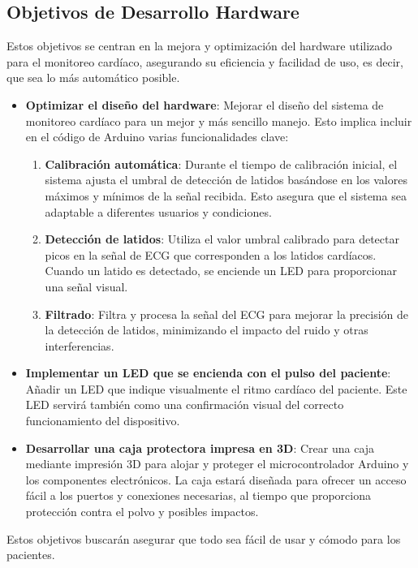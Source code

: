 \subsection{Objetivos de Desarrollo Hardware}

Estos objetivos se centran en la mejora y optimización del hardware utilizado para el monitoreo cardíaco, asegurando su eficiencia y facilidad de uso, es decir, que sea lo más automático posible.

\begin{itemize}
\item \textbf{Optimizar el diseño del hardware}: Mejorar el diseño del sistema de monitoreo cardíaco para un mejor y más sencillo manejo. Esto implica incluir en el código de Arduino varias funcionalidades clave:
\begin{enumerate}
    \item \textbf{Calibración automática}: Durante el tiempo de calibración inicial, el sistema ajusta el umbral de detección de latidos basándose en los valores máximos y mínimos de la señal recibida. Esto asegura que el sistema sea adaptable a diferentes usuarios y condiciones.
    \item \textbf{Detección de latidos}: Utiliza el valor umbral calibrado para detectar picos en la señal de ECG que corresponden a los latidos cardíacos. Cuando un latido es detectado, se enciende un LED para proporcionar una señal visual.
    \item \textbf{Filtrado}: Filtra y procesa la señal del ECG para mejorar la precisión de la detección de latidos, minimizando el impacto del ruido y otras interferencias.
\end{enumerate}


\item \textbf{Implementar un LED que se encienda con el pulso del paciente}: Añadir un LED que indique visualmente el ritmo cardíaco del paciente. Este LED servirá también como una confirmación visual del correcto funcionamiento del dispositivo.
\item \textbf{Desarrollar una caja protectora impresa en 3D}: Crear una caja mediante impresión 3D para alojar y proteger el microcontrolador Arduino y los componentes electrónicos. La caja estará diseñada para ofrecer un acceso fácil a los puertos y conexiones necesarias, al tiempo que proporciona protección contra el polvo y posibles impactos.

\end{itemize}

Estos objetivos buscarán asegurar que todo sea fácil de usar y cómodo para los pacientes.
